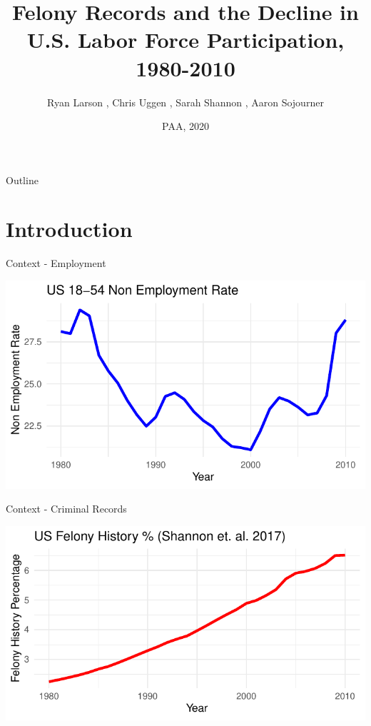 \documentclass{beamer}\usepackage[]{graphicx}\usepackage[]{color}
\title[Felony Records and the U.S. Labor Force]{Felony Records and the Decline in U.S. Labor Force Participation, 1980-2010}
\subtitle{}
\author[Larson et. al.]{Ryan Larson \inst{1}, Chris Uggen \inst{1}, Sarah Shannon \inst{2}, Aaron Sojourner \inst{3}}
\institute [UMN, UGA] %
{
  \inst{1}
  Department of Sociology, 
  University of Minnesota\\
  \inst{2}
  Department of Sociology, 
  University of Georgia\\
  \inst{3}
  Carlson School of Management, 
  University of Minnesota
 
}
\date{PAA, 2020}
\makeatletter
\def\maxwidth{ %
  \ifdim\Gin@nat@width>\linewidth
    \linewidth
  \else
    \Gin@nat@width
  \fi
}
\newenvironment{knitrout}{}{} %
\makeatother
\begin{document}
\begin{frame}
  \titlepage
\end{frame}

\begin{frame}{Outline}
  \tableofcontents
\end{frame}

\section{Introduction}

\begin{frame}{Context - Employment}



\begin{knitrout}
\color{fgcolor}
\includegraphics[width=\maxwidth]{figure/unnamed-chunk-2-1} 

\end{knitrout}



\end{frame}

\begin{frame}{Context - Criminal Records}


\begin{knitrout}
\color{fgcolor}
\includegraphics[width=\maxwidth]{figure/unnamed-chunk-3-1} 

\end{knitrout}



\end{frame}
\end{document}
